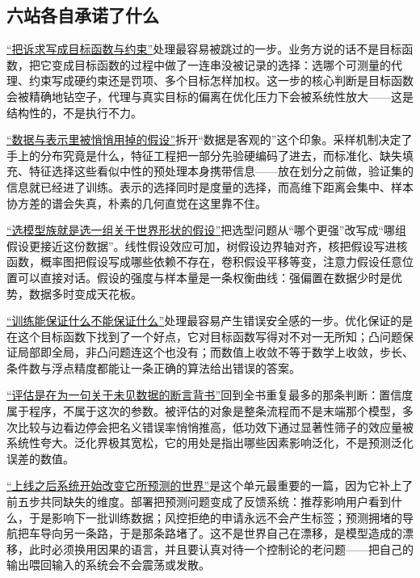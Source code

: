 \subsection{六站各自承诺了什么}

\hyperref[sec:17-Synthesis/01-System-Lifecycle/01]{``把诉求写成目标函数与约束''}处理最容易被跳过的一步。业务方说的话不是目标函数，把它变成目标函数的过程中做了一连串没被记录的选择：选哪个可测量的代理、约束写成硬约束还是罚项、多个目标怎样加权。这一步的核心判断是目标函数会被精确地钻空子，代理与真实目标的偏离在优化压力下会被系统性放大——这是结构性的，不是执行不力。

\hyperref[sec:17-Synthesis/01-System-Lifecycle/02]{``数据与表示里被悄悄用掉的假设''}拆开``数据是客观的''这个印象。采样机制决定了手上的分布究竟是什么，特征工程把一部分先验硬编码了进去，而标准化、缺失填充、特征选择这些看似中性的预处理本身携带信息——放在划分之前做，验证集的信息就已经进了训练。表示的选择同时是度量的选择，而高维下距离会集中、样本协方差的谱会失真，朴素的几何直觉在这里靠不住。

\hyperref[sec:17-Synthesis/01-System-Lifecycle/03]{``选模型族就是选一组关于世界形状的假设''}把选型问题从``哪个更强''改写成``哪组假设更接近这份数据''。线性假设效应可加，树假设边界轴对齐，核把假设写进核函数，概率图把假设写成哪些依赖不存在，卷积假设平移等变，注意力假设任意位置可以直接对话。假设的强度与样本量是一条权衡曲线：强偏置在数据少时是优势，数据多时变成天花板。

\hyperref[sec:17-Synthesis/01-System-Lifecycle/04]{``训练能保证什么不能保证什么''}处理最容易产生错误安全感的一步。优化保证的是在这个目标函数下找到了一个好点，它对目标函数写得对不对一无所知；凸问题保证局部即全局，非凸问题连这个也没有；而数值上收敛不等于数学上收敛，步长、条件数与浮点精度都能让一条正确的算法给出错误的答案。

\hyperref[sec:17-Synthesis/01-System-Lifecycle/05]{``评估是在为一句关于未见数据的断言背书''}回到全书重复最多的那条判断：置信度属于程序，不属于这次的参数。被评估的对象是整条流程而不是末端那个模型，多次比较与边看边停会把名义错误率悄悄推高，低功效下通过显著性筛子的效应量被系统性夸大。泛化界极其宽松，它的用处是指出哪些因素影响泛化，不是预测泛化误差的数值。

\hyperref[sec:17-Synthesis/01-System-Lifecycle/06]{``上线之后系统开始改变它所预测的世界''}是这个单元最重要的一篇，因为它补上了前五步共同缺失的维度。部署把预测问题变成了反馈系统：推荐影响用户看到什么，于是影响下一批训练数据；风控拒绝的申请永远不会产生标签；预测拥堵的导航把车导向另一条路，于是那条路堵了。这不是世界自己在漂移，是模型造成的漂移，此时必须换用因果的语言，并且要认真对待一个控制论的老问题——把自己的输出喂回输入的系统会不会震荡或发散。

